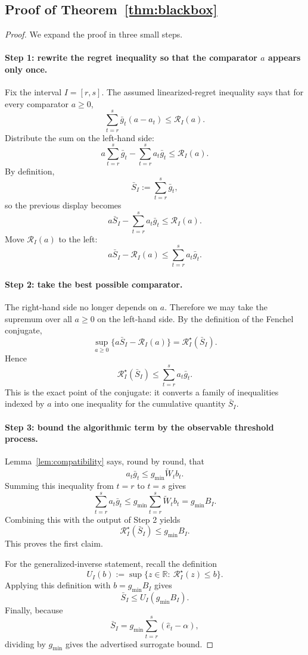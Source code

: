 \documentclass[11pt]{article}
\newcommand{\R}{\mathbb{R}}
\newcommand{\1}{\mathbf{1}}
\begin{document}
\subsection{Proof of Theorem~\ref{thm:blackbox}}
\label{app:proof-blackbox}

\begin{proof}
We expand the proof in three small steps.

\paragraph{Step 1: rewrite the regret inequality so that the comparator $a$ appears only once.}
Fix the interval $I=[r,s]$. The assumed linearized-regret inequality says that for every comparator $a\ge 0$,
\[
\sum_{t=r}^s \bar g_t(a-a_t)\le \mathcal R_I(a).
\]
Distribute the sum on the left-hand side:
\[
a\sum_{t=r}^s \bar g_t-\sum_{t=r}^s a_t\bar g_t\le \mathcal R_I(a).
\]
By definition,
\[
\bar S_I:=\sum_{t=r}^s \bar g_t,
\]
so the previous display becomes
\[
a\bar S_I-\sum_{t=r}^s a_t\bar g_t\le \mathcal R_I(a).
\]
Move $\mathcal R_I(a)$ to the left:
\[
a\bar S_I-\mathcal R_I(a)\le \sum_{t=r}^s a_t\bar g_t.
\]

\paragraph{Step 2: take the best possible comparator.}
The right-hand side no longer depends on $a$. Therefore we may take the supremum over all $a\ge 0$ on the left-hand side. By the definition of the Fenchel conjugate,
\[
\sup_{a\ge 0}\{a\bar S_I-\mathcal R_I(a)\}=\mathcal R_I^\star(\bar S_I).
\]
Hence
\[
\mathcal R_I^\star(\bar S_I)\le \sum_{t=r}^s a_t\bar g_t.
\]
This is the exact point of the conjugate: it converts a family of inequalities indexed by $a$ into one inequality for the cumulative quantity $\bar S_I$.

\paragraph{Step 3: bound the algorithmic term by the observable threshold process.}
Lemma~\ref{lem:compatibility} says, round by round, that
\[
a_t\bar g_t\le g_{\min}\widetilde W_t b_t.
\]
Summing this inequality from $t=r$ to $t=s$ gives
\[
\sum_{t=r}^s a_t\bar g_t\le g_{\min}\sum_{t=r}^s \widetilde W_t b_t=g_{\min}B_I.
\]
Combining this with the output of Step 2 yields
\[
\mathcal R_I^\star(\bar S_I)\le g_{\min}B_I.
\]
This proves the first claim.

For the generalized-inverse statement, recall the definition
\[
U_I(b):=\sup\{z\in\R:\ \mathcal R_I^\star(z)\le b\}.
\]
Applying this definition with $b=g_{\min}B_I$ gives
\[
\bar S_I\le U_I(g_{\min}B_I).
\]
Finally, because
\[
\bar S_I=g_{\min}\sum_{t=r}^s(\hat e_t-\alpha),
\]
dividing by $g_{\min}$ gives the advertised surrogate bound.
\end{proof}
\end{document}
